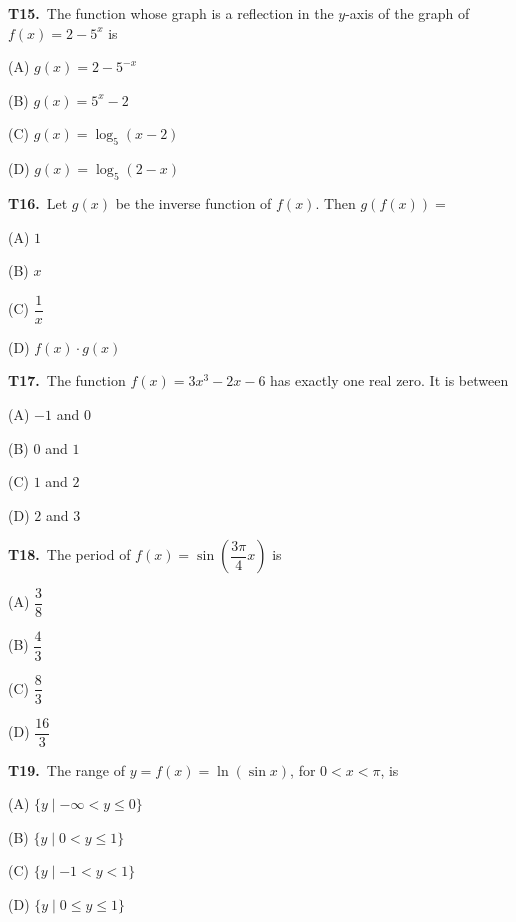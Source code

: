 \documentclass[11pt]{article}
\begin{document}
\bigskip\noindent\textbf{T15.}\ The function whose graph is a reflection in the $y$-axis of the graph of $f(x) = 2 - 5^x$ is
\begin{list}{}{\setlength{\leftmargin}{3em}\setlength{\labelwidth}{2.5em}\setlength{\itemsep}{0pt}\setlength{\topsep}{2pt}}
\item[(A)] $g(x) = 2 - 5^{-x}$
\item[(B)] $g(x) = 5^x - 2$
\item[(C)] $g(x) = \log_5(x-2)$
\item[(D)] $g(x) = \log_5(2-x)$
\end{list}

\bigskip\noindent\textbf{T16.}\ Let $g(x)$ be the inverse function of $f(x)$. Then $g(f(x)) =$
\begin{list}{}{\setlength{\leftmargin}{3em}\setlength{\labelwidth}{2.5em}\setlength{\itemsep}{0pt}\setlength{\topsep}{2pt}}
\item[(A)] $1$
\item[(B)] $x$
\item[(C)] $\dfrac{1}{x}$
\item[(D)] $f(x) \cdot g(x)$
\end{list}

\bigskip\noindent\textbf{T17.}\ The function $f(x) = 3x^3 - 2x - 6$ has exactly one real zero. It is between
\begin{list}{}{\setlength{\leftmargin}{3em}\setlength{\labelwidth}{2.5em}\setlength{\itemsep}{0pt}\setlength{\topsep}{2pt}}
\item[(A)] $-1$ and $0$
\item[(B)] $0$ and $1$
\item[(C)] $1$ and $2$
\item[(D)] $2$ and $3$
\end{list}

\bigskip\noindent\textbf{T18.}\ The period of $f(x) = \sin\!\left(\dfrac{3\pi}{4}x\right)$ is
\begin{list}{}{\setlength{\leftmargin}{3em}\setlength{\labelwidth}{2.5em}\setlength{\itemsep}{0pt}\setlength{\topsep}{2pt}}
\item[(A)] $\dfrac{3}{8}$
\item[(B)] $\dfrac{4}{3}$
\item[(C)] $\dfrac{8}{3}$
\item[(D)] $\dfrac{16}{3}$
\end{list}

\bigskip\noindent\textbf{T19.}\ The range of $y = f(x) = \ln(\sin x)$, for $0 < x < \pi$, is
\begin{list}{}{\setlength{\leftmargin}{3em}\setlength{\labelwidth}{2.5em}\setlength{\itemsep}{0pt}\setlength{\topsep}{2pt}}
\item[(A)] $\{y \mid -\infty < y \leq 0\}$
\item[(B)] $\{y \mid 0 < y \leq 1\}$
\item[(C)] $\{y \mid -1 < y < 1\}$
\item[(D)] $\{y \mid 0 \leq y \leq 1\}$
\end{list}
\end{document}
